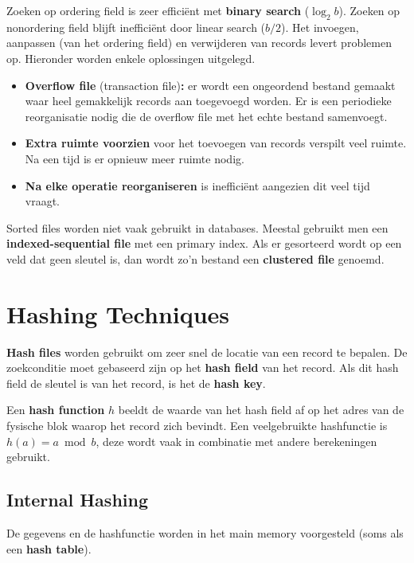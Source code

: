 Zoeken op ordering field is zeer effici\"ent met \textbf{binary search} ($\log_2 b$). Zoeken op nonordering field blijft ineffici\"ent door linear search ($b/2$). Het invoegen, aanpassen (van het ordering field) en verwijderen van records levert problemen op. Hieronder worden enkele oplossingen uitgelegd.
\begin{itemize}
	\item \textbf{Overflow file} (transaction file)\textbf{:} er wordt een ongeordend bestand gemaakt waar heel gemakkelijk records aan toegevoegd worden. Er is een periodieke reorganisatie nodig die de overflow file met het echte bestand samenvoegt.
	\item \textbf{Extra ruimte voorzien} voor het toevoegen van records verspilt veel ruimte. Na een tijd is er opnieuw meer ruimte nodig.
	\item \textbf{Na elke operatie reorganiseren} is ineffici\"ent aangezien dit veel tijd vraagt.
\end{itemize}
Sorted files worden niet vaak gebruikt in databases. Meestal gebruikt men een \textbf{indexed-sequential file} met een primary index. Als er gesorteerd wordt op een veld dat geen sleutel is, dan wordt zo'n bestand een \textbf{clustered file} genoemd.



\section{Hashing Techniques}
\textbf{Hash files} worden gebruikt om zeer snel de locatie van een record te bepalen. De zoekconditie moet gebaseerd zijn op het \textbf{hash field} van het record. Als dit hash field de sleutel is van het record, is het de \textbf{hash key}.

Een \textbf{hash function} $h$ beeldt de waarde van het hash field af op het adres van de fysische blok waarop het record zich bevindt. Een veelgebruikte hashfunctie is $h(a) = a \bmod b$, deze wordt vaak in combinatie met andere berekeningen gebruikt.


\subsection{Internal Hashing}
De gegevens en de hashfunctie worden in het main memory voorgesteld (soms als een \textbf{hash table}).

